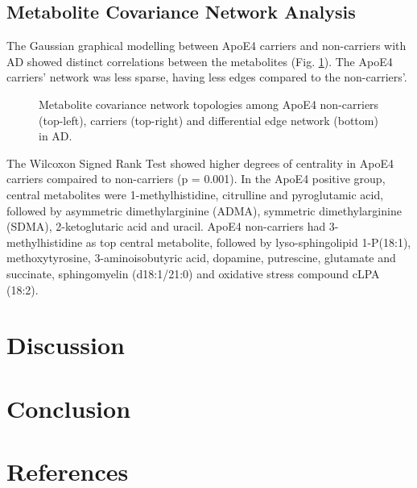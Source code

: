 \documentclass{amsart}
\begin{document}
\subsection{Metabolite Covariance Network Analysis}
The Gaussian graphical modelling between ApoE4 carriers and non-carriers with AD showed distinct correlations between the metabolites (Fig. \ref{netAD}). The ApoE4 carriers' network was less sparse, having less edges compared to the non-carriers'. 
\begin{figure}[!hb]\label{netAD}
\centerline{}
\caption{Metabolite covariance network topologies among ApoE4 non-carriers (top-left), carriers (top-right) and differential edge network (bottom) in AD.}  
\end{figure}

The Wilcoxon Signed Rank Test showed higher degrees of centrality in ApoE4 carriers compaired to non-carriers (p = 0.001). In the ApoE4 positive group, central metabolites were 1-methylhistidine, citrulline and pyroglutamic acid, followed by asymmetric dimethylarginine (ADMA), symmetric dimethylarginine (SDMA), 2-ketoglutaric acid and uracil. ApoE4 non-carriers had 3-methylhistidine as top central metabolite, followed by lyso-sphingolipid 1-P(18:1), methoxytyrosine, 3-aminoisobutyric acid, dopamine, putrescine, glutamate and succinate, sphingomyelin (d18:1/21:0) and oxidative stress compound cLPA (18:2).


\clearpage
\section{Discussion} \label{discuss}


\clearpage
\section{Conclusion} \label{concl}






\newpage
\section*{References}
\printbibliography[heading=none]
\clearpage
\appendix 
\clearpage
\end{document}
